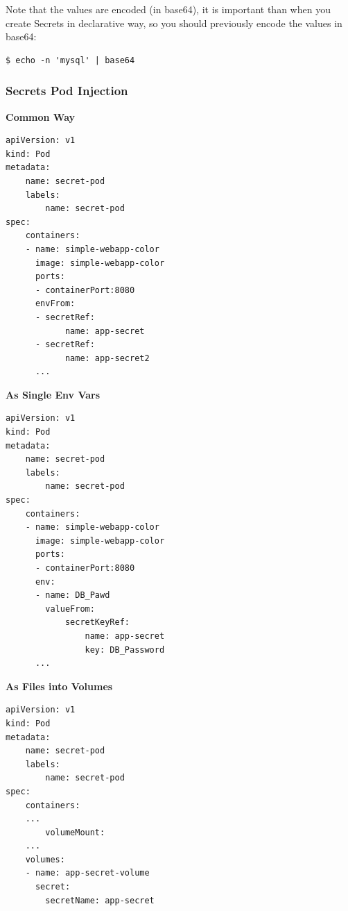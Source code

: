 \documentclass{article}
\newenvironment{blocktemplateIII}[1]{%
    \tcolorbox[beamer,%
    noparskip,breakable,
    ,colframe=Red,%
    colbacklower=LimeGreen!75!LightGreen,%
    title=#1]}%
    {\endtcolorbox}
\newenvironment{codetemplate}[1][]{%
  \mybasecolorbox[#1]
  \itshape
}{%
  \endmybasecolorbox
}
\begin{document}
\begin{blocktemplateIII}{WARNING}
Note that the values are encoded (in base64), it is important than when you create Secrets in declarative way, so you should previously encode the values in base64:
\begin{codetemplate}{}
\begin{verbatim}
$ echo -n 'mysql' | base64
\end{verbatim}
\end{codetemplate}
\end{blocktemplateIII}

\subsubsection{Secrets Pod Injection}
\textbf{Common Way}
\begin{codetemplate}{}
\begin{verbatim}
apiVersion: v1
kind: Pod
metadata:
    name: secret-pod
    labels:
        name: secret-pod
spec:
    containers:
    - name: simple-webapp-color
      image: simple-webapp-color
      ports:
      - containerPort:8080
      envFrom:
      - secretRef:
            name: app-secret
      - secretRef:
            name: app-secret2
      ...
\end{verbatim}
\end{codetemplate}

\textbf{As Single Env Vars}
\begin{codetemplate}{}
\begin{verbatim}
apiVersion: v1
kind: Pod
metadata:
    name: secret-pod
    labels:
        name: secret-pod
spec:
    containers:
    - name: simple-webapp-color
      image: simple-webapp-color
      ports:
      - containerPort:8080
      env:
      - name: DB_Pawd
        valueFrom:
            secretKeyRef:
                name: app-secret
                key: DB_Password
      ...
\end{verbatim}
\end{codetemplate}

\textbf{As Files into Volumes}
\begin{codetemplate}{}
\begin{verbatim}
apiVersion: v1
kind: Pod
metadata:
    name: secret-pod
    labels:
        name: secret-pod
spec:
    containers:
    ...
        volumeMount:
    ...
    volumes:
    - name: app-secret-volume
      secret:
        secretName: app-secret
\end{verbatim}
\end{codetemplate}
\end{document}
